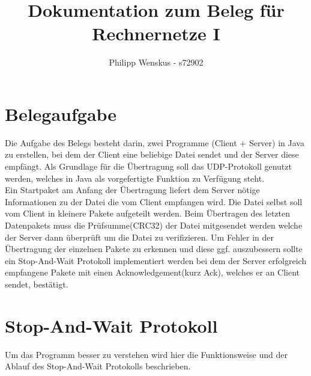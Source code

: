 \documentclass[a4paper, 12pt]{scrartcl}
\title{Dokumentation zum Beleg für Rechnernetze I}
\author{Philipp Wenskus - s72902}
\begin{document}

\maketitle
\newpage
\tableofcontents
\newpage
\section{Belegaufgabe}
Die Aufgabe des Belegs besteht darin, zwei Programme (Client + Server) in Java zu erstellen, bei dem der Client eine beliebige Datei sendet und der Server diese empfängt. Als Grundlage für die Übertragung soll das UDP-Protokoll genutzt werden, welches in Java als vorgefertigte Funktion zu Verfügung steht.\\
Ein Startpaket am Anfang der Übertragung liefert dem Server nötige Informationen zu der Datei die vom Client empfangen wird. Die Datei selbst soll vom Client in kleinere Pakete aufgeteilt werden. Beim Übertragen des letzten Datenpakets muss die Prüfsumme(CRC32) der Datei mitgesendet werden welche der Server dann überprüft um die Datei zu verifizieren. Um Fehler in der Übertragung der einzelnen Pakete zu erkennen und diese ggf. auszubessern sollte ein Stop-And-Wait Protokoll implementiert werden bei dem der Server erfolgreich empfangene Pakete mit einen Acknowledgement(kurz Ack), welches er an Client sendet, bestätigt.

\section{Stop-And-Wait Protokoll} \label{stopNwait}
Um das Programm besser zu verstehen wird hier die Funktionsweise und der Ablauf des Stop-And-Wait Protokolls beschrieben.
\end{document}
